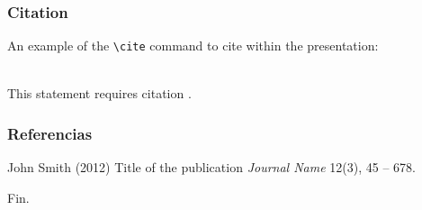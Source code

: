 \documentclass{beamer}
\begin{document}

\begin{frame}[fragile] %
\frametitle{Citation}
An example of the \verb|\cite| command to cite within the presentation:\\~

This statement requires citation \cite{p1}.
\end{frame}


\begin{frame}
\frametitle{Referencias}
\footnotesize{
  \begin{thebibliography}{99} %
     John Smith (2012)
      \newblock Title of the publication
      \newblock \emph{Journal Name} 12(3), 45 -- 678.
  \end{thebibliography}
}
\end{frame}


\begin{frame}
\Huge{\centerline{Fin.}}
\end{frame}

\end{document}
